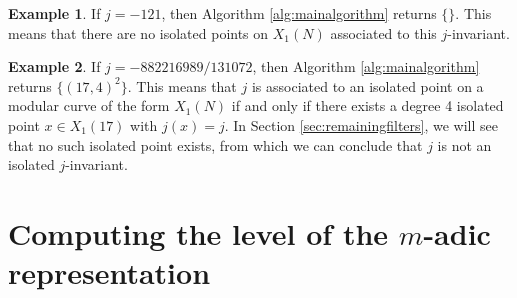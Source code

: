 \documentclass[11pt,reqno]{amsart}
\theoremstyle{plain}
\newtheorem{theorem}{Theorem}%
\theoremstyle{definition}
\newtheorem{example}[theorem]{Example}
\newcommand{\Q}{\bQ}
\newcommand{\abbey}[1]{\textcolor{blue}{Abbey: #1}}
\newcommand{\timo}[1]{\textcolor{red}{Timo: #1}}
\begin{document}
\begin{example}
If $j=-121$, then Algorithm \ref{alg:mainalgorithm} returns $\{\}$. This means that there are no isolated points on $X_1(N)$ associated to this $j$-invariant.
\end{example}

\begin{example}
If $j=-882216989/131072$, then Algorithm \ref{alg:mainalgorithm} returns  $\{( 17,4) ^2\}$. This means that $j$ is associated to an isolated point on a modular curve of the form $X_1(N)$ if and only if there exists a degree 4 isolated point $x \in X_1(17)$ with $j(x)=j$. In Section \ref{sec:remainingfilters}, we will see that no such isolated point exists, from which we can conclude that $j$ is not an isolated $j$-invariant.
\end{example}




\section{\texorpdfstring{Computing the level of the $m$-adic representation}{Computing the level of the m-adic representation}}
\label{sec:madicrep}
\end{document}
